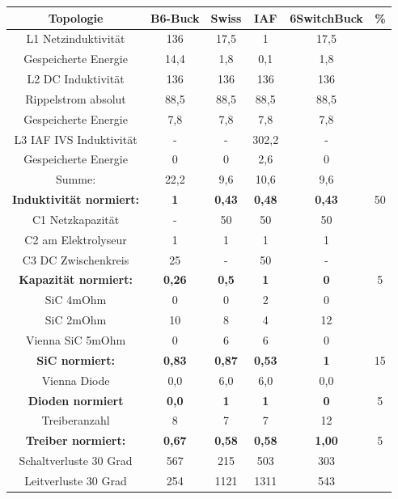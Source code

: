 \begin{table}
	\label{An:Entscheidungsmatrix}

\begin{tabular}{|c|c|c|c|c|c|}
	\hline
	Topologie & B6-Buck & Swiss & IAF & 6SwitchBuck & \% \\
	\hline
	L1 Netzinduktivität & 136 & 17,5 & 1 & 17,5 &\\
	\hline
	Gespeicherte Energie & 14,4 & 1,8 & 0,1 & 1,8 &\\
	\hline
	L2 DC Induktivität  & 136 & 136 & 136 & 136 &\\
	\hline
	Rippelstrom absolut & 88,5 & 88,5 & 88,5 & 88,5& \\
	\hline
	Gespeicherte Energie & 7,8 & 7,8 & 7,8 & 7,8 &\\
	\hline
	L3 IAF IVS Induktivität & - & - & 302,2 & - &\\
	\hline
	Gespeicherte Energie  & 0 & 0 & 2,6 & 0 &\\
	\hline
	Summe: & 22,2 & 9,6 & 10,6 & 9,6 &\\
	\hline
	\bfseries Induktivität normiert: & \bfseries 1 &\bfseries 0,43 &\bfseries 0,48 &\bfseries 0,43 & 50\\
	\hline
	C1 Netzkapazität & - & 50 & 50 & 50& \\
	\hline
	C2 am Elektrolyseur & 1 & 1 & 1 & 1 &\\
	\hline
	C3 DC Zwischenkreis & 25 & - & 50 & - &\\
	\hline
	\bfseries Kapazität normiert: &\bfseries 0,26 &\bfseries 0,5 &\bfseries 1 &\bfseries 0 &5\\
	\hline
	SiC 4mOhm & 0 & 0 & 2 & 0 &\\
	\hline
	SiC 2mOhm & 10 & 8 & 4 & 12 &\\
	\hline
	Vienna SiC 5mOhm & 0 & 6 & 6 & 0 &\\
	\hline
	\bfseries SiC normiert: &\bfseries 0,83 &\bfseries 0,87 &\bfseries 0,53 &\bfseries 1 &15\\
	\hline
	Vienna Diode & 0,0 & 6,0 & 6,0 & 0,0& \\
	\hline
	\bfseries Dioden normiert &\bfseries 0,0 & \bfseries1 &\bfseries 1 &\bfseries 0&5 \\
	\hline
	Treiberanzahl & 8 & 7 & 7 & 12 &\\
	\hline
	\bfseries Treiber normiert: &\bfseries 0,67 &\bfseries 0,58 &\bfseries 0,58 &\bfseries 1,00& 5\\
	\hline
	Schaltverluste 30 Grad & 567 & 215 & 503 & 303 &\\
	\hline
	Leitverluste 30 Grad & 254 & 1121 & 1311 & 543 &\\

\end{tabular}
\end{table}
